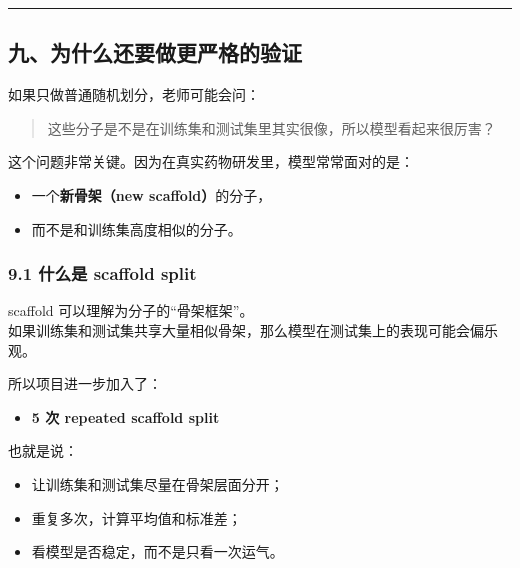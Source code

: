 \documentclass[
  ,
]{ctexart}
\providecommand{\tightlist}{%
  \setlength{\itemsep}{0pt}\setlength{\parskip}{0pt}}
\begin{document}
\begin{center}\rule{0.5\linewidth}{0.5pt}\end{center}

\hypertarget{ux4e5dux4e3aux4ec0ux4e48ux8fd8ux8981ux505aux66f4ux4e25ux683cux7684ux9a8cux8bc1}{%
\subsection{九、为什么还要做更严格的验证}\label{ux4e5dux4e3aux4ec0ux4e48ux8fd8ux8981ux505aux66f4ux4e25ux683cux7684ux9a8cux8bc1}}

如果只做普通随机划分，老师可能会问：

\begin{quote}
这些分子是不是在训练集和测试集里其实很像，所以模型看起来很厉害？
\end{quote}

这个问题非常关键。因为在真实药物研发里，模型常常面对的是：

\begin{itemize}
\tightlist
\item
  一个\textbf{新骨架（new scaffold）}的分子，
\item
  而不是和训练集高度相似的分子。
\end{itemize}

\hypertarget{ux4ec0ux4e48ux662f-scaffold-split}{%
\subsubsection{9.1 什么是 scaffold
split}\label{ux4ec0ux4e48ux662f-scaffold-split}}

scaffold 可以理解为分子的``骨架框架''。\\
如果训练集和测试集共享大量相似骨架，那么模型在测试集上的表现可能会偏乐观。

所以项目进一步加入了：

\begin{itemize}
\tightlist
\item
  \textbf{5 次 repeated scaffold split}
\end{itemize}

也就是说：

\begin{itemize}
\tightlist
\item
  让训练集和测试集尽量在骨架层面分开；
\item
  重复多次，计算平均值和标准差；
\item
  看模型是否稳定，而不是只看一次运气。
\end{itemize}
\end{document}
